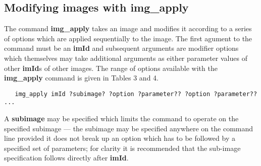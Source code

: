 \subsection{Modifying images with img\_apply}

The command {\bf img\_apply} takes an image and modifies it according to
a series of options which are applied sequentially to the image.  The
first agument to the command must be an {\bf imId} and subsequent arguments
are modifier options which themselves may take additional arguments as
either parameter values of other {\bf imId}s of other images.  The range
of options available with the {\bf img\_apply} command is given in 
Tables 3 and 4.
\begin{verbatim}
   img_apply imId ?subimage? ?option ?parameter?? ?option ?parameter?? ...
\end{verbatim}
A {\bf subimage} may be specified which limits the command to operate on the
specified subimage --- the subimage may be specified anywhere on the
command line provided it does not break up an option which has to be followed
by a specified set of parameters; for clarity it is recommended that the
sub-image specification follows directly after {\bf imId}.
